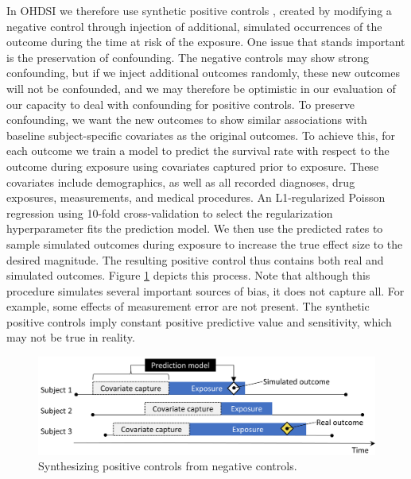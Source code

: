 \documentclass[11pt]{book}
\begin{document}
In OHDSI we therefore use synthetic positive controls
\citep{schuemie_2018}, created by modifying a negative control through
injection of additional, simulated occurrences of the outcome during the
time at risk of the exposure. One issue that stands important is the
preservation of confounding. The negative controls may show strong
confounding, but if we inject additional outcomes randomly, these new
outcomes will not be confounded, and we may therefore be optimistic in
our evaluation of our capacity to deal with confounding for positive
controls. To preserve confounding, we want the new outcomes to show
similar associations with baseline subject-specific covariates as the
original outcomes. To achieve this, for each outcome we train a model to
predict the survival rate with respect to the outcome during exposure
using covariates captured prior to exposure. These covariates include
demographics, as well as all recorded diagnoses, drug exposures,
measurements, and medical procedures. An L1-regularized Poisson
regression \citep{suchard_2013} using 10-fold cross-validation to select
the regularization hyperparameter fits the prediction model. We then use
the predicted rates to sample simulated outcomes during exposure to
increase the true effect size to the desired magnitude. The resulting
positive control thus contains both real and simulated outcomes. Figure
\ref{fig:posControlSynth} depicts this process. Note that although this
procedure simulates several important sources of bias, it does not
capture all. For example, some effects of measurement error are not
present. The synthetic positive controls imply constant positive
predictive value and sensitivity, which may not be true in reality.

\begin{figure}

{\centering \includegraphics[width=0.9\linewidth]{images/MethodValidity/posControlSynth} 

}

\caption{Synthesizing positive controls from negative controls.}\label{fig:posControlSynth}
\end{figure}
\end{document}
